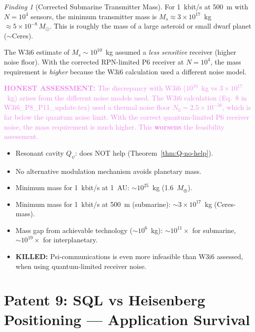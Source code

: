 \documentclass[11pt]{article}
\theoremstyle{definition}
\theoremstyle{remark}
\newtheorem{finding}[theorem]{Finding}
\newcommand{\ee}[1]{\times10^{#1}}
\newcommand{\Qpsi}{Q_\psi}
\newcommand{\Msun}{M_\odot}
\newcommand{\honest}[1]{\textcolor{violet}{\textbf{HONEST ASSESSMENT:} #1}}
\newcommand{\killed}[1]{\textcolor{red!70!black}{\textbf{KILLED:} #1}}
\begin{document}
\begin{finding}[Corrected Submarine Transmitter Mass]
\label{find:sub-mass}
For 1~kbit/s at 500~m with $N = 10^4$ sensors, the minimum transmitter
mass is $M_s \approx 3\ee{17}$~kg $\approx 5\ee{-8}\,\Msun$. This is
roughly the mass of a large asteroid or small dwarf planet ($\sim$Ceres).

The W3i6 estimate of $M_s \sim 10^{10}$~kg assumed a \emph{less sensitive}
receiver (higher noise floor). With the corrected RPN-limited P6 receiver
at $N = 10^4$, the mass requirement is \emph{higher} because the W3i6
calculation used a different noise model.

\honest{The discrepancy with W3i6 ($10^{10}$~kg vs $3\ee{17}$~kg)
arises from the different noise models used. The W3i6 calculation
(Eq.~8 in W3i6\_P8\_P11\_update.tex) used a thermal noise floor
$N_0 = 2.5\ee{-38}$, which is far below the quantum noise limit. With
the correct quantum-limited P6 receiver noise, the mass requirement is
much higher. This \textbf{worsens} the feasibility assessment.}
\end{finding}

\begin{tcolorbox}[colback=red!5!white, colframe=red!60!black,
  title=\textbf{P8 W3i7 Verdict: Mass Gap Worse Than Previously Assessed}]
\begin{itemize}[nosep]
\item Resonant cavity $\Qpsi$: does NOT help (Theorem~\ref{thm:Q-no-help}).
\item No alternative modulation mechanism avoids planetary mass.
\item Minimum mass for 1~kbit/s at 1~AU: $\sim 10^{25}$~kg (1.6~$M_\oplus$).
\item Minimum mass for 1~kbit/s at 500~m (submarine): $\sim 3\ee{17}$~kg
  (Ceres-mass).
\item Mass gap from achievable technology ($\sim 10^6$~kg): $\sim 10^{11}\times$
  for submarine, $\sim 10^{19}\times$ for interplanetary.
\item \killed{Psi-communications is even more infeasible than W3i6 assessed,
  when using quantum-limited receiver noise.}
\end{itemize}
\end{tcolorbox}

\part{Patent 9: SQL vs Heisenberg Positioning --- Application Survival}
\label{part:P9}
\end{document}
